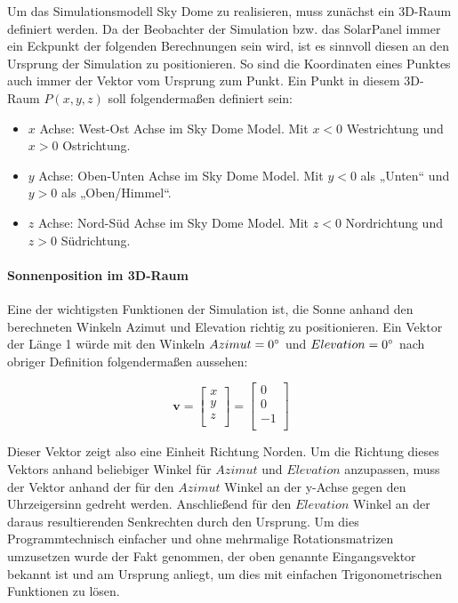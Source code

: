 Um das Simulationsmodell Sky Dome zu realisieren, muss zunächst ein 3D-Raum definiert werden. Da der Beobachter der Simulation bzw. das SolarPanel immer ein Eckpunkt der folgenden Berechnungen sein wird, ist es sinnvoll diesen an den Ursprung der Simulation zu positionieren. So sind die Koordinaten eines Punktes auch immer der Vektor vom Ursprung zum Punkt. Ein Punkt in diesem 3D-Raum $P(x,y,z)$ soll folgendermaßen definiert sein:
\begin{itemize}
    \item $x$ Achse: West-Ost Achse im Sky Dome Model. Mit $x < 0$ Westrichtung und $x > 0$ Ostrichtung.
    \item $y$ Achse: Oben-Unten Achse im Sky Dome Model. Mit $y < 0$ als „Unten“ und $y > 0$ als „Oben/Himmel“.
    \item $z$ Achse: Nord-Süd Achse im Sky Dome Model. Mit $z < 0$ Nordrichtung und $z > 0$ Südrichtung.
\end{itemize}

\paragraph{Sonnenposition im 3D-Raum}

Eine der wichtigsten Funktionen der Simulation ist, die Sonne anhand den berechneten Winkeln Azimut und Elevation richtig zu positionieren. Ein Vektor der Länge 1 würde mit den Winkeln $Azimut = 0\degree$ und $Elevation = 0\degree$ nach obriger Definition folgendermaßen aussehen:

\[
\mathbf{v} = \begin{bmatrix}
x \\
y \\
z \\
\end{bmatrix}
=
\begin{bmatrix}
0 \\
0 \\
-1 \\
\end{bmatrix}
\]

Dieser Vektor zeigt also eine Einheit Richtung Norden. Um die Richtung dieses Vektors anhand beliebiger Winkel für $Azimut$ und $Elevation$ anzupassen, muss der Vektor anhand der für den $Azimut$ Winkel an der y-Achse gegen den Uhrzeigersinn gedreht werden. Anschließend für den $Elevation$ Winkel an der daraus resultierenden Senkrechten durch den Ursprung. Um dies Programmtechnisch einfacher und ohne mehrmalige Rotationsmatrizen umzusetzen wurde der Fakt genommen, der oben genannte Eingangsvektor bekannt ist und am Ursprung anliegt, um dies mit einfachen Trigonometrischen Funktionen zu lösen.

